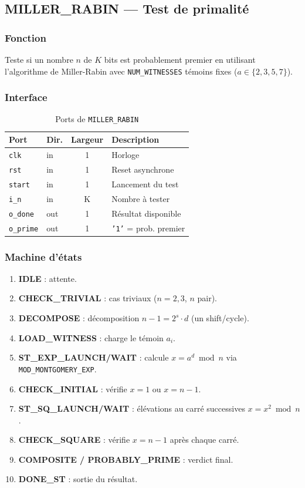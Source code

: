 \subsection{MILLER\_RABIN --- Test de primalité}
\label{sec:mr}

\subsubsection{Fonction}
Teste si un nombre $n$ de $K$ bits est probablement premier en utilisant
l'algorithme de Miller-Rabin avec \texttt{NUM\_WITNESSES} témoins
fixes ($a \in \{2, 3, 5, 7\}$).

\subsubsection{Interface}
\begin{table}[H]
\centering
\caption{Ports de \texttt{MILLER\_RABIN}}
\begin{tabular}{llcp{5cm}}
\toprule
\textbf{Port} & \textbf{Dir.} & \textbf{Largeur} & \textbf{Description} \\
\midrule
\texttt{clk}     & in  & 1 & Horloge \\
\texttt{rst}     & in  & 1 & Reset asynchrone \\
\texttt{start}   & in  & 1 & Lancement du test \\
\texttt{i\_n}    & in  & K & Nombre à tester \\
\texttt{o\_done}  & out & 1 & Résultat disponible \\
\texttt{o\_prime} & out & 1 & \texttt{'1'} = prob. premier \\
\bottomrule
\end{tabular}
\end{table}


\subsubsection{Machine d'états}
\begin{enumerate}
  \item \textbf{IDLE} : attente.
  \item \textbf{CHECK\_TRIVIAL} : cas triviaux ($n=2,3$, $n$ pair).
  \item \textbf{DECOMPOSE} : décomposition $n-1 = 2^s \cdot d$ (un shift/cycle).
  \item \textbf{LOAD\_WITNESS} : charge le témoin $a_i$.
  \item \textbf{ST\_EXP\_LAUNCH/WAIT} : calcule $x = a^d \bmod n$ via
        \texttt{MOD\_MONTGOMERY\_EXP}.
  \item \textbf{CHECK\_INITIAL} : vérifie $x = 1$ ou $x = n-1$.
  \item \textbf{ST\_SQ\_LAUNCH/WAIT} : élévations au carré successives
        $x = x^2 \bmod n$.
  \item \textbf{CHECK\_SQUARE} : vérifie $x = n-1$ après chaque carré.
  \item \textbf{COMPOSITE / PROBABLY\_PRIME} : verdict final.
  \item \textbf{DONE\_ST} : sortie du résultat.
\end{enumerate}

